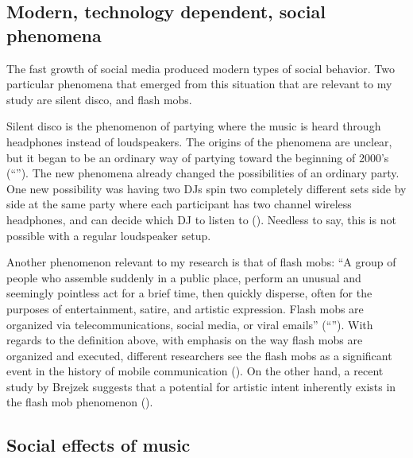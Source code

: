 \subsection{Modern, technology dependent, social phenomena}


The fast growth of social media produced modern types of social behavior.
Two particular phenomena that emerged from this situation that are relevant to my study are silent disco, and flash mobs.

Silent disco is the phenomenon of partying where the music is heard through headphones instead of loudspeakers.
The origins of the phenomena are unclear, but it began to be an ordinary way of partying toward the beginning of 2000's (``'').
The new phenomena already changed the possibilities of an ordinary party.
One new possibility was having two DJs spin two completely different sets side by side at the same party where each participant has two channel wireless headphones, and can decide which DJ to listen to (\cite{web:headphonedisco}).
Needless to say, this is not possible with a regular loudspeaker setup.

Another phenomenon relevant to my research is that of flash mobs: ``A group of people who assemble suddenly in a public place, perform an unusual and seemingly pointless act for a brief time, then quickly disperse, often for the purposes of entertainment, satire, and artistic expression. Flash mobs are organized via telecommunications, social media, or viral emails'' (``'').
With regards to the definition above, with emphasis on the way flash mobs are organized and executed, different researchers see the flash mobs as a significant event in the history of mobile communication (\cite{nicholson05}).
On the other hand, a recent study by Brejzek suggests that a potential for artistic intent inherently exists in the flash mob phenomenon (\cite*{brejzek10}).

\subsection{Social effects of music}

